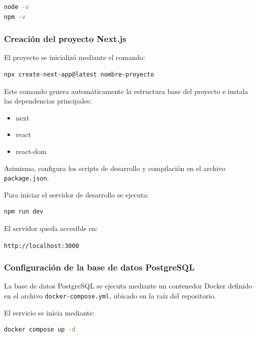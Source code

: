 \begin{lstlisting}[language=bash]
node -v
npm -v
\end{lstlisting}

\subsubsection*{Creación del proyecto Next.js}

El proyecto se inicializó mediante el comando:

\begin{lstlisting}[language=bash]
npx create-next-app@latest nombre-proyecto
\end{lstlisting}

Este comando genera automáticamente la estructura base del proyecto e instala las dependencias principales:

\begin{itemize}
    \item next
    \item react
    \item react-dom
\end{itemize}

Asimismo, configura los scripts de desarrollo y compilación en el archivo \texttt{package.json}.

Para iniciar el servidor de desarrollo se ejecuta:

\begin{lstlisting}[language=bash]
npm run dev
\end{lstlisting}

El servidor queda accesible en:

\begin{center}
\texttt{http://localhost:3000}
\end{center}

\subsubsection*{Configuración de la base de datos PostgreSQL}

La base de datos PostgreSQL se ejecuta mediante un contenedor Docker definido en el archivo \texttt{docker-compose.yml}, ubicado en la raíz del repositorio.

El servicio se inicia mediante:

\begin{lstlisting}[language=bash]
docker compose up -d
\end{lstlisting}

